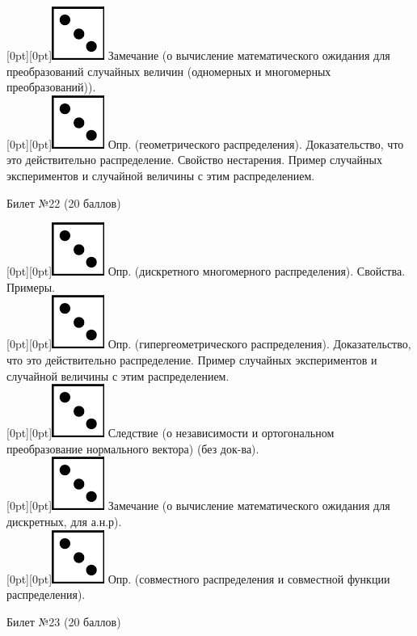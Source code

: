 \documentclass[preview]{standalone}
\begin{document}
\raisebox{-1pt}[0pt][0pt]{\includegraphics[width=0.02\linewidth]{3.png}} Замечание (о вычисление  математического ожидания для преобразований случайных величин (одномерных и многомерных преобразований)). \\
\raisebox{-1pt}[0pt][0pt]{\includegraphics[width=0.02\linewidth]{3.png}}  Опр. (геометрического распределения). Доказательство, что это действительно распределение. Свойство нестарения. Пример случайных экспериментов и случайной величины с этим распределением. \\      
\begin{center} {\Large Билет №22 (20 баллов)} \end{center}
\raisebox{-1pt}[0pt][0pt]{\includegraphics[width=0.02\linewidth]{3.png}} Опр. (дискретного многомерного распределения). Свойства. Примеры. \\
\raisebox{-1pt}[0pt][0pt]{\includegraphics[width=0.02\linewidth]{3.png}} Опр. (гипергеометрического распределения). Доказательство, что это действительно распределение. Пример случайных экспериментов и случайной величины с этим распределением. \\      
\raisebox{-1pt}[0pt][0pt]{\includegraphics[width=0.02\linewidth]{3.png}} Следствие (о независимости и  ортогональном преобразование нормального вектора) (без док-ва). \\ 
\raisebox{-1pt}[0pt][0pt]{\includegraphics[width=0.02\linewidth]{3.png}} Замечание (о вычисление  математического ожидания для дискретных, для а.н.р). \\
\raisebox{-1pt}[0pt][0pt]{\includegraphics[width=0.02\linewidth]{3.png}} Опр. (совместного распределения и  совместной функции распределения). \\
\begin{center} {\Large Билет №23 (20 баллов)} \end{center}
\end{document}
